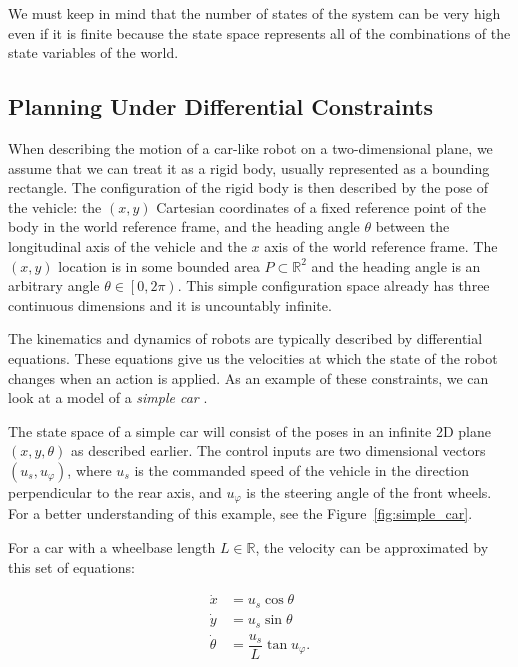 We must keep in mind that the number of states of the system can be very high even if it is finite because the state space represents all of the combinations of the state variables of the world.

\subsection{Planning Under Differential Constraints}
\label{sec:planning_under_differential_constraints}

When describing the motion of a car-like robot on a two-dimensional plane, we assume that we can treat it as a rigid body, usually represented as a bounding rectangle. The configuration of the rigid body is then described by the pose of the vehicle: the $\left(x,y\right)$ Cartesian coordinates of a fixed reference point of the body in the world reference frame, and the heading angle $\theta$ between the longitudinal axis of the vehicle and the $x$ axis of the world reference frame. The $(x, y)$ location is in some bounded area $P\subset\mathbb{R}^2$ and the heading angle is an arbitrary angle $\theta\in\left[0,2\pi\right)$. This simple configuration space already has three continuous dimensions and it is uncountably infinite.

The kinematics and dynamics of robots are typically described by differential equations. These equations give us the velocities at which the state of the robot changes when an action is applied. As an example of these constraints, we can look at a model of a \textit{simple car} \cite[Section~13.1.2.1]{lavalle_2006}.

\begin{example}
The state space of a simple car will consist of the poses in an infinite 2D plane $(x, y, \theta)$ as described earlier. The control inputs are two dimensional vectors $\left(u_s, u_\varphi\right)$, where $u_s$ is the commanded speed of the vehicle in the direction perpendicular to the rear axis, and $u_\varphi$ is the steering angle of the front wheels. For a better understanding of this example, see the Figure~\ref{fig:simple_car}.

For a car with a wheelbase length $L\in\mathbb{R}$, the velocity can be approximated by this set of equations:

\begin{equation}
\begin{aligned}
	\dot{x}&=u_s \cos \theta \\
	\dot{y}&=u_s \sin \theta \\
	\dot{\theta}&=\dfrac{u_s}{L} \tan u_\varphi.
\end{aligned}
\end{equation}
\end{example}

